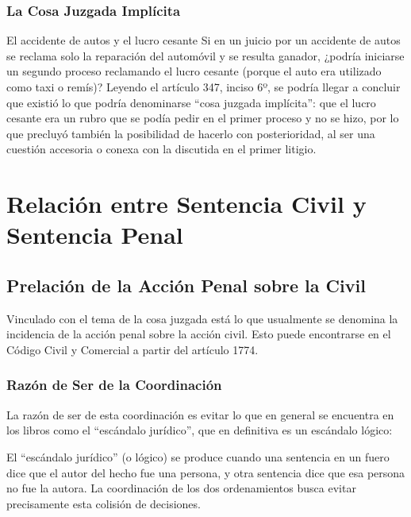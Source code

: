 \documentclass[12pt,oneside]{book}
\begin{document}
\subsection{La Cosa Juzgada Implícita}

\begin{example}{El accidente de autos y el lucro cesante}
Si en un juicio por un accidente de autos se reclama solo la reparación del automóvil y se resulta ganador, ¿podría iniciarse un segundo proceso reclamando el lucro cesante (porque el auto era utilizado como taxi o remís)? Leyendo el artículo 347, inciso 6º, se podría llegar a concluir que existió lo que podría denominarse ``cosa juzgada implícita'': que el lucro cesante era un rubro que se podía pedir en el primer proceso y no se hizo, por lo que precluyó también la posibilidad de hacerlo con posterioridad, al ser una cuestión accesoria o conexa con la discutida en el primer litigio.
\end{example}


\chapter{Relación entre Sentencia Civil y Sentencia Penal}

\section{Prelación de la Acción Penal sobre la Civil}

Vinculado con el tema de la cosa juzgada está lo que usualmente se denomina la incidencia de la acción penal sobre la acción civil. Esto puede encontrarse en el Código Civil y Comercial a partir del artículo 1774.

\subsection{Razón de Ser de la Coordinación}

La razón de ser de esta coordinación es evitar lo que en general se encuentra en los libros como el ``escándalo jurídico'', que en definitiva es un escándalo lógico:

\begin{important}
El ``escándalo jurídico'' (o lógico) se produce cuando una sentencia en un fuero dice que el autor del hecho fue una persona, y otra sentencia dice que esa persona no fue la autora. La coordinación de los dos ordenamientos busca evitar precisamente esta colisión de decisiones.
\end{important}
\end{document}
